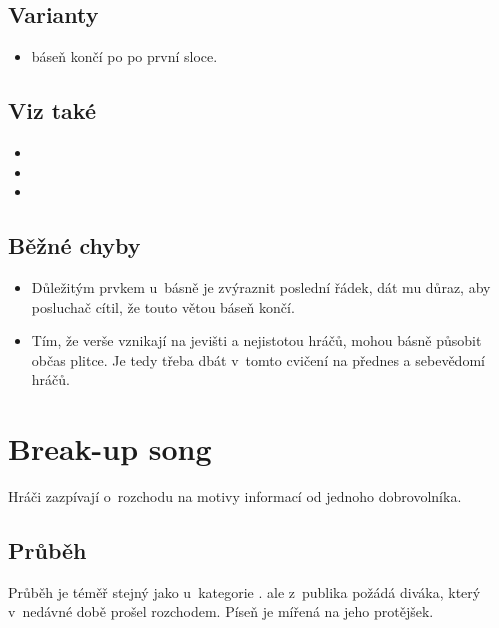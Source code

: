 \subsection{Varianty} \begin{itemize}
\item  báseň končí po po první sloce.
\end{itemize}
  
\subsection{Viz také} \begin{itemize}
\item {}
\item {}
\item {}
\end{itemize}
 
\subsection{Běžné chyby} \begin{itemize}
\item Důležitým prvkem u~básně je zvýraznit poslední řádek, dát mu důraz, aby posluchač cítil, že touto větou báseň končí.
\item Tím, že verše vznikají na jevišti a nejistotou hráčů, mohou básně působit občas plitce. Je tedy třeba dbát v~tomto cvičení na přednes a sebevědomí hráčů.
\end{itemize}
 
 
 
 
\needspace{5cm} \section{Break-up song} \label{break-up song}  
 
Hráči zazpívají o~rozchodu na motivy informací od jednoho dobrovolníka. 
 
\subsection{ Průběh } Průběh je téměř stejný jako u~kategorie .  ale z~publika požádá diváka, který v~nedávné době prošel rozchodem. Píseň je mířená na jeho protějšek. 
 
